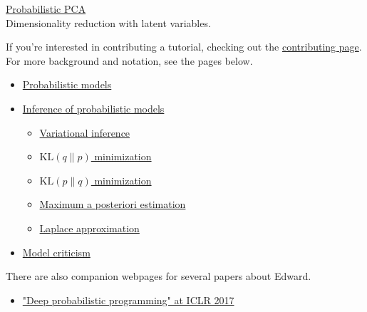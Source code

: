 \href{probabilistic-pca}{Probabilistic PCA} \\
Dimensionality reduction with latent variables.

If you're interested in contributing a tutorial, checking out the
\href{/contributing}{contributing page}.
For more background and notation, see the pages below.
\begin{itemize}
  \item \href{model}{Probabilistic models}
  \item \href{inference}{Inference of probabilistic models}
  \begin{itemize}
   \item \href{variational-inference}{Variational inference}
   \item \href{klqp}{$\text{KL}(q\|p)$ minimization}
   \item \href{klpq}{$\text{KL}(p\|q)$ minimization}
   \item \href{map}{Maximum a posteriori estimation}
   \item \href{map-laplace}{Laplace approximation}
  \end{itemize}
  \item \href{criticism}{Model criticism}
\end{itemize}

There are also companion webpages for several papers about Edward.
\begin{itemize}
\item
\href{/iclr2017}{"Deep probabilistic programming" at ICLR 2017}
\end{itemize}
